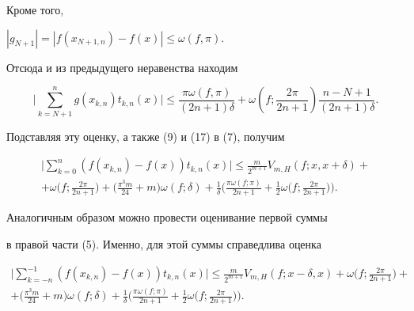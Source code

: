Кроме того,


$|g_{N+1}|=|f(x_{N+1,n})-f(x)|\le\omega(f,\pi)$.


Отсюда и из предыдущего неравенства находим


$$


\bigg|\sum_{k=N+1}^ng(x_{k,n})t_{k,n}(x)\bigg|\le


\frac{\pi\omega(f,\pi)}{(2n+1)\delta}+\omega\left(f;\frac


{2\pi}{2n+1}\right)\frac{n-N+1}{(2n+1)\delta}.


$$





Подставляя эту оценку, а также (9) и (17) в (7), получим


\begin{multline*}


\bigg|\sum_{k=0}^n(f(x_{k,n})-f(x))t_{k,n}(x)\bigg|\le


\frac m{2^{m+1}}V_{m,H}(f;x,x+\delta)+\\


%


+\omega\bigg(f;\frac{2\pi}{2n+1}\bigg)+\bigg(\frac{\pi^3m}{24}


+m\bigg)\omega(f;\delta)+\frac1{\delta}\bigg(\frac{\pi


\omega(f;\pi)}{2n+1}+\frac12\omega\bigg(f;\frac{2\pi}{2n+1}


\bigg)\bigg).


\end{multline*}





Аналогичным образом можно провести оценивание первой суммы


в правой части (5). Именно, для этой суммы справедлива оценка


\begin{multline*}


\bigg|\sum_{k=-n}^{-1}(f(x_{k,n})-f(x))t_{k,n}(x)


\bigg|\le\frac m{2^{m+1}}V_{m,H}(f;x-\delta,x)+\omega


\bigg(f;\frac{2\pi}{2n+1}\bigg)+\\


%


+\bigg(\frac{\pi^3m}{24}+m\bigg)\omega(f;\delta)+\frac1{\delta}


\bigg(\frac{\pi\omega(f;\pi)}{2n+1}+\frac12\omega\bigg(f;


\frac{2\pi}{2n+1}\bigg)\bigg).


\end{multline*}





